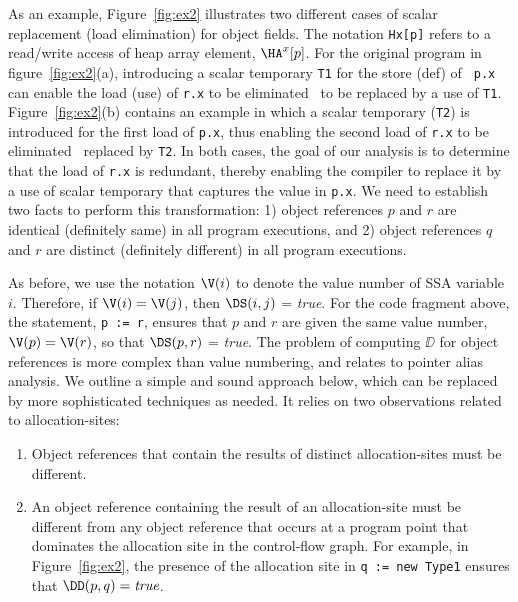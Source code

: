As an example, 
Figure~\ref{fig:ex2} illustrates two different cases of scalar
replacement (load elimination) for object fields. 
The notation {\tt Hx[p]} refers to a read/write access of heap array
element, 
$\HA^x[p]$.
For the original program in figure~\ref{fig:ex2}(a),
introducing a scalar temporary {\tt T1} for the store (def) of {\tt
p.x} can enable the load (use) of {\tt r.x} to be eliminated \ie\ to
be replaced by a use of {\tt T1}.  Figure~\ref{fig:ex2}(b)
contains an example in which a scalar temporary ({\tt T2}) is
introduced for the first load of {\tt p.x}, thus enabling the second
load of {\tt r.x} to be eliminated \ie\ replaced by {\tt T2}. 
In both cases, the goal of our analysis is to determine that the load
of {\tt r.x} is redundant, thereby enabling
the compiler to replace it by 
a use of scalar temporary that captures the value in {\tt p.x}.
We need to establish two facts to perform this transformation:
1) object references $p$ and $r$ are identical (definitely same) in 
all program executions, and 2)
object references $q$ and $r$ are distinct (definitely different) in
all program executions. 

As before, we use the notation $\V(i)$ to denote the value number of SSA 
variable $i$.  Therefore, if $\V(i) = \V(j)$, then 
$\DS(i,j)$ = {\it true}.  
For the code fragment above, the  statement, {\tt p~:=~r},
ensures that $p$ and $r$ are given the same value number,
$\V(p) = \V(r)$, so that $\DS(p,r)$ = {\it true}.
The problem of
computing $\DD$ for object references is more complex than value numbering, and relates
to pointer alias analysis.  We outline a simple  and sound approach
below, which can be replaced by more sophisticated techniques as needed.
It relies on two observations related to allocation-sites:
\begin{enumerate}
\item Object references that contain the results of distinct allocation-sites
must be different.
\item An object reference containing the result of an allocation-site
must be different from any object reference 
that occurs at a program point that dominates the allocation site in the control-flow graph.
For example, in Figure~\ref{fig:ex2},
the presence of the allocation site in {\tt q~:=~new~Type1}
ensures that $\DD(p,q) = \mbox{\it true}$.
\end{enumerate}


